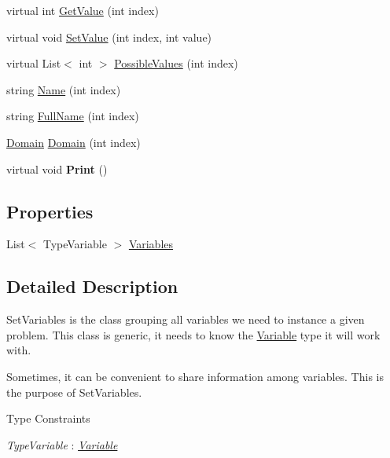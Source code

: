 \begin{DoxyCompactItemize}
\item 
virtual int \hyperlink{classghost_1_1SetVariables_3_01TypeVariable_01_4_a4a5330430dfd94a46a718e28a0355d91}{Get\-Value} (int index)
\item 
virtual void \hyperlink{classghost_1_1SetVariables_3_01TypeVariable_01_4_a6f4f72d36727cf96522ed6e5635b5c27}{Set\-Value} (int index, int value)
\item 
virtual List$<$ int $>$ \hyperlink{classghost_1_1SetVariables_3_01TypeVariable_01_4_ad382b5c9045b7f5d5bc1baf2b8121bb4}{Possible\-Values} (int index)
\item 
string \hyperlink{classghost_1_1SetVariables_3_01TypeVariable_01_4_adea50d515383d6c0252d36a164213d83}{Name} (int index)
\item 
string \hyperlink{classghost_1_1SetVariables_3_01TypeVariable_01_4_a7f32c243dd4c5b434c2b3d51c8b37e5e}{Full\-Name} (int index)
\item 
\hyperlink{classghost_1_1Domain}{Domain} \hyperlink{classghost_1_1SetVariables_3_01TypeVariable_01_4_ab9627fb96652fc476da1a0d04ebdc815}{Domain} (int index)
\item 
\hypertarget{classghost_1_1SetVariables_3_01TypeVariable_01_4_ac254fd0d11c3effcaff7689d9954062b}{virtual void {\bfseries Print} ()}\label{classghost_1_1SetVariables_3_01TypeVariable_01_4_ac254fd0d11c3effcaff7689d9954062b}

\end{DoxyCompactItemize}
\subsection*{Properties}
\begin{DoxyCompactItemize}
\item 
List$<$ Type\-Variable $>$ \hyperlink{classghost_1_1SetVariables_3_01TypeVariable_01_4_a1aa6a24ebcf2782dbd09e186e5c000d8}{Variables}
\end{DoxyCompactItemize}


\subsection{Detailed Description}
Set\-Variables is the class grouping all variables we need to instance a given problem. This class is generic, it needs to know the \hyperlink{classghost_1_1Variable}{Variable} type it will work with.

Sometimes, it can be convenient to share information among variables. This is the purpose of Set\-Variables. \begin{Desc}
\item[Type Constraints]\begin{description}
\item[{\em Type\-Variable} : {\em \hyperlink{classghost_1_1Variable}{Variable}}]\end{description}
\end{Desc}


